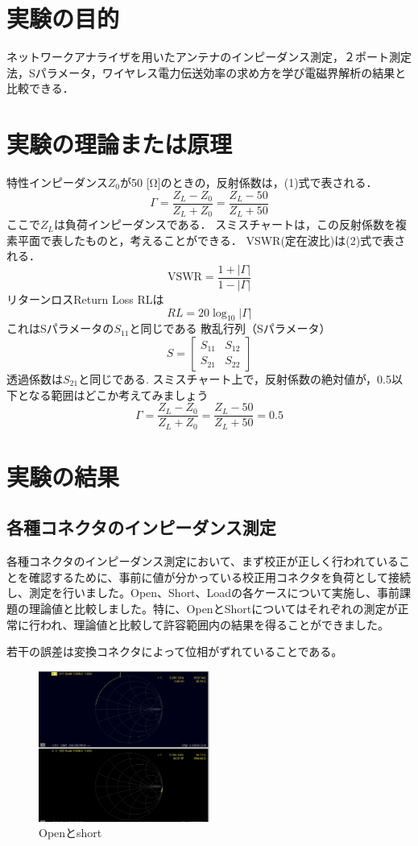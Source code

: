 \documentclass[a4paper,11pt,xelatex,ja=standard]{bxjsarticle}
\begin{document}
\section{実験の目的}
    ネットワークアナライザを用いたアンテナのインピーダンス測定，２ポート測定法，Sパラメータ，ワイヤレス電力伝送効率の求め方を学び電磁界解析の結果と比較できる．

\section{実験の理論または原理}
    特性インピーダンス\(Z_0\)が50 [Ω]のときの，反射係数は，(1)式で表される．
    \[\Gamma = \frac{Z_L−Z_0}{Z_L+Z_0} = \frac{Z_L−50}{Z_L+50} \tag{1}\]
    ここで\(Z_L\)は負荷インピーダンスである．
    スミスチャートは，この反射係数を複素平面で表したものと，考えることができる．
    VSWR(定在波比)は(2)式で表される．
    \[\text{VSWR} = \frac{1+|\Gamma|}{1−|\Gamma|} \tag{2}\]
    リターンロスReturn Loss RLは
    \[RL = 20\log_{10}|\Gamma| \tag{3}\]
    これはSパラメータの\(S_{11}\)と同じである
    散乱行列（Sパラメータ）
    \[S = \begin{bmatrix}S_{11} & S_{12} \\ S_{21} & S_{22}\end{bmatrix}\]
    透過係数は\(S_{21}\)と同じである.
    スミスチャート上で，反射係数の絶対値が，0.5以下となる範囲はどこか考えてみましょう
    \[\Gamma = \frac{Z_L− Z_0}{Z_L + Z_0} = \frac{Z_L− 50}{Z_L + 50} = 0.5\]

\section{実験の結果}
    \subsection{各種コネクタのインピーダンス測定}
        各種コネクタのインピーダンス測定において、まず校正が正しく行われていることを確認するために、事前に値が分かっている校正用コネクタを負荷として接続し、測定を行いました。Open、Short、Loadの各ケースについて実施し、事前課題の理論値と比較しました。特に、OpenとShortについてはそれぞれの測定が正常に行われ、理論値と比較して許容範囲内の結果を得ることができました。

        若干の誤差は変換コネクタによって位相がずれていることである。

        \begin{figure}[H]
            \centering
            \includegraphics[width=0.5\textwidth]{./img/24-3/1.png}
            \caption{Openとshort}
        \end{figure}
\end{document}
